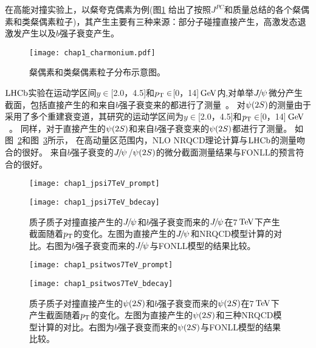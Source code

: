 在高能对撞实验上，以粲夸克偶素为例(图\ref{fig:charmonium} 给出了按照$J^{PC}$和质量总结的各个粲偶素和类粲偶素粒子)，其产生主要有三种来源：部分子碰撞直接产生，高激发态退激发产生以及$b$强子衰变产生。
\begin{figure}[!tbp]
\begin{center}
\texttt{[image: chap1\_charmonium.pdf]}
\end{center}
\caption{粲偶素和类粲偶素粒子分布示意图。}
\label{fig:charmonium}
\end{figure}
$\mbox{LHCb}$实验在运动学区间$y\in$[2.0，4.5]和$\mbox{$p_{\mathrm{ T}}$}\in$[0，14]$\mathrm{\,Ge\kern -0.1em V}$内,对单举${{J\mskip -3mu/\mskip -2mu\psi\mskip 2mu}}$微分产生截面，包括直接产生的和来自$b$强子衰变来的都进行了测量~\cite{Aaij:2011jh}。
对${\psi{(2S)}}$的测量由于采用了多个重建衰变道，其研究的运动学区间为$y\in$[2.0，4.5]和$\mbox{$p_{\mathrm{ T}}$}\in$[0，14]$\mathrm{\,Ge\kern -0.1em V}$~\cite{Aaij:2012ag}。
同样，对于直接产生的${\psi{(2S)}}$和来自$b$强子衰变来的${\psi{(2S)}}$都进行了测量。
如图~\ref{fig:jpsi7TeV}和图~\ref{fig:psitwos7TeV}所示，
在高动量区范围内，NLO NRQCD理论计算与$\mbox{LHCb}$的测量吻合的很好。
来自$b$强子衰变的${{J\mskip -3mu/\mskip -2mu\psi\mskip 2mu}}$/${\psi{(2S)}}$的微分截面测量结果与FONLL的预言符合的很好。

\begin{figure}[!tbp]
\centering
\begin{minipage}[t]{0.49\textwidth}
\centering
\texttt{[image: chap1\_jpsi7TeV\_prompt]}
\end{minipage}
\begin{minipage}[t]{0.49\textwidth}
\centering
\texttt{[image: chap1\_jpsi7TeV\_bdecay]}
\end{minipage}
\caption{质子质子对撞直接产生的${{J\mskip -3mu/\mskip -2mu\psi\mskip 2mu}}$和$b$强子衰变而来的${{J\mskip -3mu/\mskip -2mu\psi\mskip 2mu}}$在7$\mathrm{\,Te\kern -0.1em V}$下产生截面随着$\mbox{$p_{\mathrm{ T}}$}$的变化。左图为直接产生的${{J\mskip -3mu/\mskip -2mu\psi\mskip 2mu}}$和NRQCD模型计算的对比。右图为$b$强子衰变而来的${{J\mskip -3mu/\mskip -2mu\psi\mskip 2mu}}$与FONLL模型的结果比较。}
\label{fig:jpsi7TeV}
\end{figure}


\begin{figure}[!tbp]
\centering
\begin{minipage}[t]{0.49\textwidth}
\centering
\texttt{[image: chap1\_psitwos7TeV\_prompt]}
\end{minipage}
\begin{minipage}[t]{0.49\textwidth}
\centering
\texttt{[image: chap1\_psitwos7TeV\_bdecay]}
\end{minipage}
\caption{质子质子对撞直接产生的${\psi{(2S)}}$和$b$强子衰变而来的${\psi{(2S)}}$在7$\mathrm{\,Te\kern -0.1em V}$下产生截面随着$\mbox{$p_{\mathrm{ T}}$}$的变化。左图为直接产生的${\psi{(2S)}}$和三种NRQCD模型计算的对比。右图为$b$强子衰变而来的${\psi{(2S)}}$与FONLL模型的结果比较。}
\label{fig:psitwos7TeV}
\end{figure}

